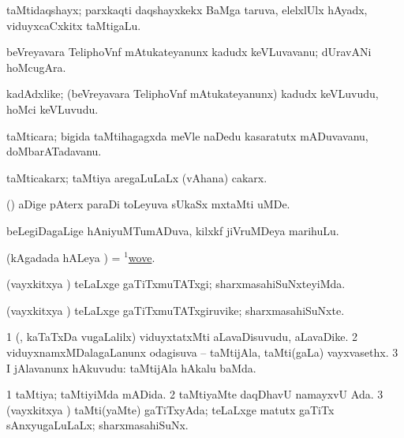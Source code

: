 \bentry
{}
\gl{\nA}
\bmng
taMtidaqshayx; parxkaqti daqshayxkekx BaMga taruva, elelxlUlx hAyadx, viduyxcaCxkitx taMtigaLu. 
\emng
\eentry

\bentry
{}
\gl{\nA}
\bmng
beVreyavara TeliphoVnf mAtukateyanunx kadudx keVLuvavanu; dUravANi hoMcugAra. 
\emng
\eentry

\bentry
{}
\gl{\nA}
\bmng
kadAdxlike; (beVreyavara TeliphoVnf mAtukateyanunx) kadudx keVLuvudu, hoMci keVLuvudu. 
\emng
\eentry

\bentry
{}
\gl{\nA}
\bmng
taMticara; bigida taMtihagagxda meVle naDedu kasaratutx mADuvavanu, doMbarATadavanu. 
\emng
\eentry

\bentry
{}
\gl{\nA}
\bmng
taMticakarx; taMtiya aregaLuLaLx (vAhana) cakarx. 
\emng
\eentry

\bentry
{}
\gl{\nA}
\bmng
(\kanmu) aDige pAterx paraDi toLeyuva sUkaSx mxtaMti uMDe. 
\emng
\eentry

\bentry
{}
\gl{\nA}
\bmng
beLegiDagaLige hAniyuMTumADuva, kilxkf jiVruMDeya marihuLu. 
\emng
\eentry

\bentry
{}
\gl{\gu}
\bmng
(kAgadada hALeya \vi) = \hyperlink{wove(1)}{$^1$wove}. 
\emng
\eentry

\bentry
{}
\gl{\kirxvi}
\bmng
(vayxkitxya \vi) teLaLxge gaTiTxmuTATxgi; sharxmasahiSuNxteyiMda. 
\emng
\eentry

\bentry
{}
\gl{\nA}
\bmng
(vayxkitxya \vi) teLaLxge gaTiTxmuTATxgiruvike; sharxmasahiSuNxte. 
\emng
\eentry

\bentry
{}
\gl{\nA}
\bmng
\bnum
\num{1} (\kanmu, kaTaTxDa \mo vugaLalilx) viduyxtatxMti aLavaDisuvudu, aLavaDike. 
\num{2} viduyxnamxMDalagaLanunx odagisuva -- taMtijAla, taMti(gaLa) vayxvasethx. 
\num{3} I jAlavanunx hAkuvudu:  taMtijAla hAkalu baMda. 
\enum
\emng
\eentry

\bentry
{} 
\gl{\gu}
\bmng
\bnum
\num{1} taMtiya; taMtiyiMda mADida. 
\num{2} taMtiyaMte daqDhavU namayxvU Ada. 
\num{3} (vayxkitxya \vi) taMti(yaMte) gaTiTxyAda; teLaLxge matutx gaTiTx sAnxyugaLuLaLx; sharxmasahiSuNx. 
\enum
\emng
\eentry

